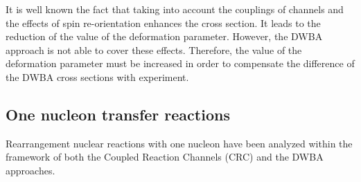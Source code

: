 \documentclass[10pt]{iopart}
\begin{document}
 It is well known the fact that taking into account the couplings of channels and the effects of spin re-orientation enhances the cross section. It leads to the reduction of the value of the deformation parameter. However, the DWBA approach is not able to cover these effects. Therefore, the value of the deformation parameter must be increased  in order to compensate the difference of the DWBA cross sections with experiment. 




 




\subsection{One nucleon transfer reactions } 
Rearrangement nuclear reactions with one nucleon have been analyzed within the framework of both the Coupled Reaction Channels (CRC) and the DWBA approaches. 
 
\end{document}
